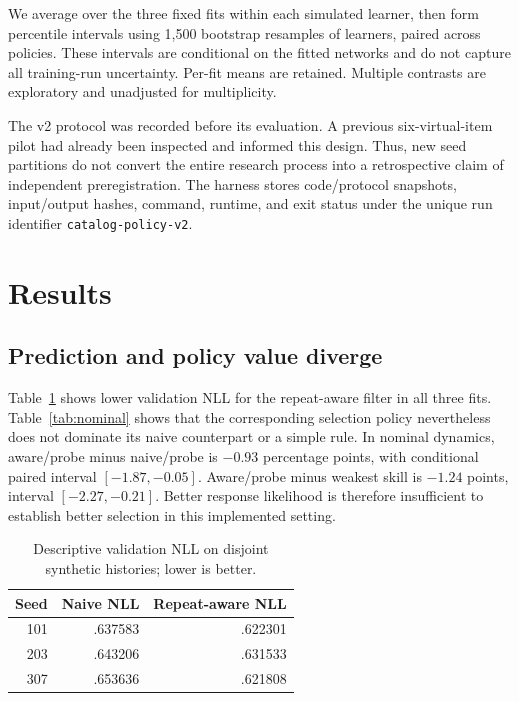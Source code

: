 \documentclass[11pt,a4paper]{article}
\begin{document}
We average over the three fixed fits within each simulated learner, then form percentile intervals using 1,500 bootstrap resamples of learners, paired across policies. These intervals are conditional on the fitted networks and do not capture all training-run uncertainty. Per-fit means are retained. Multiple contrasts are exploratory and unadjusted for multiplicity.

The v2 protocol was recorded before its evaluation. A previous six-virtual-item pilot had already been inspected and informed this design. Thus, new seed partitions do not convert the entire research process into a retrospective claim of independent preregistration. The harness stores code/protocol snapshots, input/output hashes, command, runtime, and exit status under the unique run identifier \texttt{catalog-policy-v2}.

\section{Results}
\subsection{Prediction and policy value diverge}
Table~\ref{tab:nll} shows lower validation NLL for the repeat-aware filter in all three fits. Table~\ref{tab:nominal} shows that the corresponding selection policy nevertheless does not dominate its naive counterpart or a simple rule. In nominal dynamics, aware/probe minus naive/probe is $-0.93$ percentage points, with conditional paired interval $[-1.87,-0.05]$. Aware/probe minus weakest skill is $-1.24$ points, interval $[-2.27,-0.21]$. Better response likelihood is therefore insufficient to establish better selection in this implemented setting.

\begin{table}[ht]\centering
\begin{tabular}{rrr}\toprule Seed & Naive NLL & Repeat-aware NLL\\\midrule
101 & .637583 & .622301\\203 & .643206 & .631533\\307 & .653636 & .621808\\\bottomrule
\end{tabular}
\caption{Descriptive validation NLL on disjoint synthetic histories; lower is better.}\label{tab:nll}
\end{table}
\end{document}
